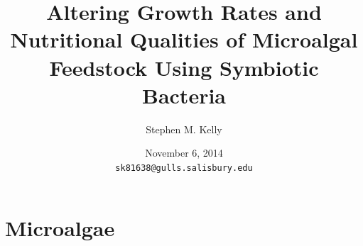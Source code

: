 \documentclass[8pt]{beamer}\usepackage[]{graphicx}\usepackage[]{color}
\begin{document}
 
\title[PPFM \& Algae]{Altering Growth Rates and Nutritional Qualities of Microalgal Feedstock Using Symbiotic Bacteria}
\author{Stephen M. Kelly}
\date{November 6, 2014 \\\texttt{sk81638@gulls.salisbury.edu}} %

\maketitle
\section{Microalgae}
\end{document}
